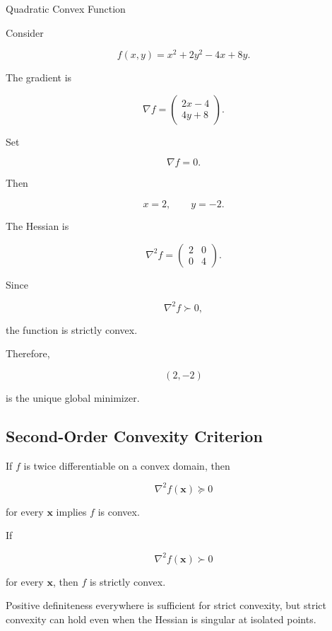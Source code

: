 \begin{workedexamplebox}{Quadratic Convex Function}

Consider

\[
f(x,y)
=
x^2+2y^2-4x+8y.
\]

The gradient is

\[
\nabla f
=
\begin{pmatrix}
2x-4\\
4y+8
\end{pmatrix}.
\]

Set

\[
\nabla f=0.
\]

Then

\[
x=2,
\qquad
y=-2.
\]

The Hessian is

\[
\nabla^2f
=
\begin{pmatrix}
2&0\\
0&4
\end{pmatrix}.
\]

Since

\[
\nabla^2f\succ0,
\]

the function is strictly convex.

Therefore,

\begin{answerbox}
\[
\boxed{
(2,-2)
}
\]

is the unique global minimizer.
\end{answerbox}

\end{workedexamplebox}

\subsection{Second-Order Convexity Criterion}
\label{subsec:second-order-convexity-criterion}

If \(f\) is twice differentiable on a convex domain, then

\[
\boxed{
\nabla^2f(\mathbf{x})
\succeq0
}
\]

for every \(\mathbf{x}\) implies \(f\) is convex.

If

\[
\boxed{
\nabla^2f(\mathbf{x})
\succ0
}
\]

for every \(\mathbf{x}\), then \(f\) is strictly convex.

Positive definiteness everywhere is sufficient for strict convexity, but
strict convexity can hold even when the Hessian is singular at isolated
points.


